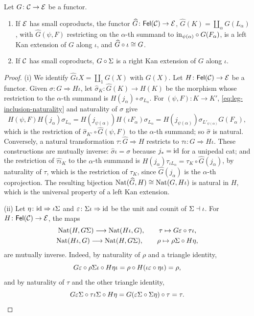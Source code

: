 \begin{proposition}\label{prop:kan}
Let $G\colon\mathcal{C}\to\mathcal{E}$ be a functor.
\begin{enumerate}
\item If $\mathcal{E}$ has small coproducts, the functor $\widehat G\colon\mathsf{Fel}(\mathcal{C})\to\mathcal{E}$,
  $\widehat G(K)=\coprod_{\alpha}G(L_\alpha)$, with $\widehat G(\psi,F)$ restricting on
  the $\alpha$-th summand to $\mathrm{in}_{\psi(\alpha)}\circ G(F_\alpha)$, is a left Kan
  extension of $G$ along $\iota$, and $\widehat G\circ\iota\cong G$.
\item If $\mathcal{C}$ has small coproducts, $G\circ\Sigma$ is a right Kan extension of
  $G$ along $\iota$.
\end{enumerate}
\end{proposition}

\begin{proof}
(i) We identify $\widehat G\iota X=\coprod_1G(X)$ with $G(X)$. Let
$H\colon\mathsf{Fel}(\mathcal{C})\to\mathcal{E}$ be a functor. Given $\sigma\colon G\Rightarrow H\iota$,
let $\widehat\sigma_K\colon\widehat G(K)\to H(K)$ be the morphism whose restriction to
the $\alpha$-th summand is $H(j_\alpha)\circ\sigma_{L_\alpha}$. For
$(\psi,F)\colon K\to K'$, \eqref{eq:leg-inclusion-naturality} and naturality of
$\sigma$ give
\[
H(\psi,F)H(j_\alpha)\sigma_{L_\alpha}=H(j_{\psi(\alpha)})H(\iota F_\alpha)\sigma_{L_\alpha}
=H(j_{\psi(\alpha)})\sigma_{L'_{\psi(\alpha)}}G(F_\alpha),
\]
which is the restriction of $\widehat\sigma_{K'}\circ\widehat G(\psi,F)$ to the
$\alpha$-th summand; so $\widehat\sigma$ is natural. Conversely, a natural
transformation $\tau\colon\widehat G\Rightarrow H$ restricts to
$\tau\iota\colon G\Rightarrow H\iota$. These constructions are mutually inverse:
$\widehat\sigma\iota=\sigma$ because $j_*=\mathrm{id}$ for a unipedal cat; and the
restriction of $\widehat{\tau\iota}_K$ to the $\alpha$-th summand is
$H(j_\alpha)\tau_{\iota L_\alpha}=\tau_K\circ\widehat G(j_\alpha)$, by naturality of
$\tau$, which is the restriction of $\tau_K$, since $\widehat G(j_\alpha)$ is the
$\alpha$-th coprojection. The resulting bijection
$\mathrm{Nat}(\widehat G,H)\cong\mathrm{Nat}(G,H\iota)$ is natural in $H$, which is
the universal property of a left Kan extension.

(ii) Let $\eta\colon\mathrm{id}\Rightarrow\iota\Sigma$ and $\varepsilon\colon\Sigma\iota\Rightarrow\mathrm{id}$
be the unit and counit of $\Sigma\dashv\iota$. For $H\colon\mathsf{Fel}(\mathcal{C})\to\mathcal{E}$, the maps
\begin{gather*}
\mathrm{Nat}(H,G\Sigma)\longrightarrow\mathrm{Nat}(H\iota,G),\qquad \tau\mapsto G\varepsilon\circ\tau\iota,\\
\mathrm{Nat}(H\iota,G)\longrightarrow\mathrm{Nat}(H,G\Sigma),\qquad \rho\mapsto\rho\Sigma\circ H\eta,
\end{gather*}
are mutually inverse. Indeed, by naturality of $\rho$ and a triangle identity,
\[
G\varepsilon\circ\rho\Sigma\iota\circ H\eta\iota=\rho\circ H(\iota\varepsilon\circ\eta\iota)=\rho,
\]
and by naturality of $\tau$ and the other triangle identity,
\[
G\varepsilon\Sigma\circ\tau\iota\Sigma\circ H\eta=G(\varepsilon\Sigma\circ\Sigma\eta)\circ\tau=\tau.
\]
\end{proof}

